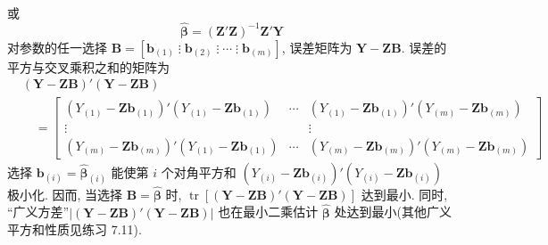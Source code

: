 
或
\label{eq:7-26}
\begin{equation}
\hat{\boldsymbol{\beta}}=(\mathbf{Z}'\mathbf{Z})^{-1}\mathbf{Z}'\mathbf{Y} \tag{7-26}
\end{equation}
对参数的任一选择 $\mathbf{B}=[\mathbf{b}_{(1)}\;\vdots\;\mathbf{b}_{(2)}\;\vdots\;\cdots\;\vdots\;\mathbf{b}_{(m)}]$, 误差矩阵为 $\mathbf{Y}-\mathbf{Z}\mathbf{B}$. 误差的平方与交叉乘积之和的矩阵为
\label{eq:7-27}
\begin{equation}
\begin{aligned}
&(\mathbf{Y}-\mathbf{Z}\mathbf{B})'(\mathbf{Y}-\mathbf{Z}\mathbf{B})\\
&\quad=\begin{bmatrix}(Y_{(1)}-\mathbf{Z}\mathbf{b}_{(1)})'(Y_{(1)}-\mathbf{Z}\mathbf{b}_{(1)})&\cdots&(Y_{(1)}-\mathbf{Z}\mathbf{b}_{(1)})'(Y_{(m)}-\mathbf{Z}\mathbf{b}_{(m)})\\\vdots&&\vdots\\(Y_{(m)}-\mathbf{Z}\mathbf{b}_{(m)})'(Y_{(1)}-\mathbf{Z}\mathbf{b}_{(1)})&\cdots&(Y_{(m)}-\mathbf{Z}\mathbf{b}_{(m)})'(Y_{(m)}-\mathbf{Z}\mathbf{b}_{(m)})\end{bmatrix}
\end{aligned} \tag{7-27}
\end{equation}
选择 $\mathbf{b}_{(i)}=\hat{\boldsymbol{\beta}}_{(i)}$ 能使第 $i$ 个对角平方和 $(Y_{(i)}-\mathbf{Z}\mathbf{b}_{(i)})'(Y_{(i)}-\mathbf{Z}\mathbf{b}_{(i)})$ 极小化. 因而, 当选择 $\mathbf{B}=\hat{\boldsymbol{\beta}}$ 时, $\operatorname{tr}[(\mathbf{Y}-\mathbf{Z}\mathbf{B})'(\mathbf{Y}-\mathbf{Z}\mathbf{B})]$ 达到最小. 同时, ``广义方差''$|(\mathbf{Y}-\mathbf{Z}\mathbf{B})'(\mathbf{Y}-\mathbf{Z}\mathbf{B})|$ 也在最小二乘估计 $\hat{\boldsymbol{\beta}}$ 处达到最小(其他广义平方和性质见练习 7.11).

